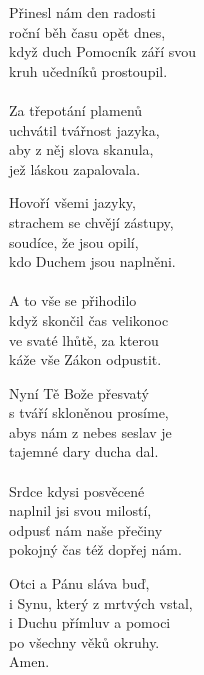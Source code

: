 \begin{translatioMulticol}{4}
Přinesl nám den radosti\\
roční běh času opět dnes,\\
když duch Pomocník září svou\\
kruh učedníků prostoupil.\\
\\
Za třepotání plamenů\\
uchvátil tvářnost jazyka,\\
aby z něj slova skanula,\\
jež láskou zapalovala.\columnbreak

Hovoří všemi jazyky,\\
strachem se chvějí zástupy,\\
soudíce, že jsou opilí,\\
kdo Duchem jsou naplněni.\\
\\
A to vše se přihodilo\\
když skončil čas velikonoc\\
ve svaté lhůtě, za kterou\\
káže vše Zákon odpustit.\columnbreak

Nyní Tě Bože přesvatý\\
s tváří skloněnou prosíme,\\
abys nám z nebes seslav je\\
tajemné dary ducha dal.\\
\\
Srdce kdysi posvěcené\\
naplnil jsi svou milostí,\\
odpusť nám naše přečiny\\
pokojný čas též dopřej nám.\columnbreak

Otci a Pánu sláva buď,\\
i Synu, který z mrtvých vstal,\\
i Duchu přímluv a pomoci\\
po všechny věků okruhy.\\
Amen.
\end{translatioMulticol}
